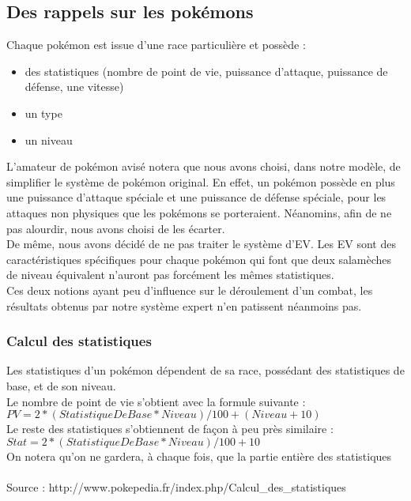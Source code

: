 \documentclass[a4paper, 12pt, final]{article}
\begin{document}
\subsection{Des rappels sur les pokémons}
Chaque pokémon est issue d'une race particulière et possède :
\begin{itemize}
	\item des statistiques (nombre de point de vie, puissance d'attaque, puissance de défense, une vitesse)
	\item un type
	\item un niveau
\end{itemize}
L'amateur de pokémon avisé notera que nous avons choisi, dans notre modèle, de simplifier le système de pokémon original. En effet, un pokémon possède en plus une puissance d'attaque spéciale et une puissance de défense spéciale, pour les attaques non physiques que les pokémons se porteraient. Néanomins, afin de ne pas alourdir, nous avons choisi de les écarter.\\
De même, nous avons décidé de ne pas traiter le système d'EV. Les EV sont des caractéristiques spécifiques pour chaque pokémon qui font que deux salamèches de niveau équivalent n'auront pas forcément les mêmes statistiques.\\
Ces deux notions ayant peu d'influence sur le déroulement d'un combat, les résultats obtenus par notre système expert n'en patissent néanmoins pas.

\subsubsection{Calcul des statistiques}
Les statistiques d'un pokémon dépendent de sa race, possédant des statistiques de base, et de son niveau.\\
Le nombre de point de vie s'obtient avec la formule suivante : $PV = 2 * (StatistiqueDeBase*Niveau)/100 + (Niveau +10)$ \\
Le reste des statistiques s'obtiennent de façon à peu près similaire :$Stat = 2 * (StatistiqueDeBase*Niveau)/100 + 10$\\
On notera qu'on ne gardera, à chaque fois, que la partie entière des statistiques\\\\
Source : http://www.pokepedia.fr/index.php/Calcul\_des\_statistiques
\end{document}
